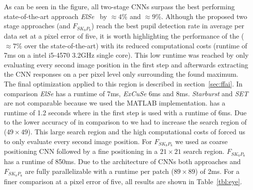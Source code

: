 As can be seen in the figure, all two-stage CNNs surpass the best performing state-of-the-art approach \emph{ElSe}~\citet{fuhl2015else} by $\approx4$\% and $\approx9$\%. Although the proposed two stage approaches (\cfin and $F_{SK_8P_8}$) reach the best pupil detection rate in average per data set at a pixel error of five, it is worth highlighting the performance of the \csin{} ($\approx7$\% over the state-of-the-art) with its reduced computational costs (runtime of 7ms on a intel i5-4570 3.2GHz single core). This low runtime was reached by only evaluating every second image position in the first step and afterwards extracting the CNN responses on a per pixel level only surrounding the found maximum. The final optimization applied to this region is described in section~\ref{sec:ffai}. In comparison \emph{ElSe} has a runtime of 7ms, \emph{ExCuSe} 6ms and \citet{swirski2012robust} 8ms. \emph{Starburst} and \emph{SET} are not comparable because we used the MATLAB implementation. \cfin has a runtime of 1.2 seconds where in the first step  is used with a runtime of 6ms. Due to the lower accuracy of  in comparison to \csin{} we had to increase the search region of \cfin ($49 \times 49$). This large search region and the high computational costs of \cfin forced us to only evaluate every second image position. For $F_{SK_8P_8}$ we used \csin{} as coarse positioning CNN followed by a fine positioning in a $21 \times 21$ search region. $F_{SK_8P_8}$ has a runtime of 850ms. Due to the architecture of CNNs both approaches \cfin and $F_{SK_8P_8}$ are fully parallelizable with a runtime per patch ($89\times89$) of 2ms. For a finer comparison at a pixel error of five, all results are shown in Table~\ref{tbl:eye}.


